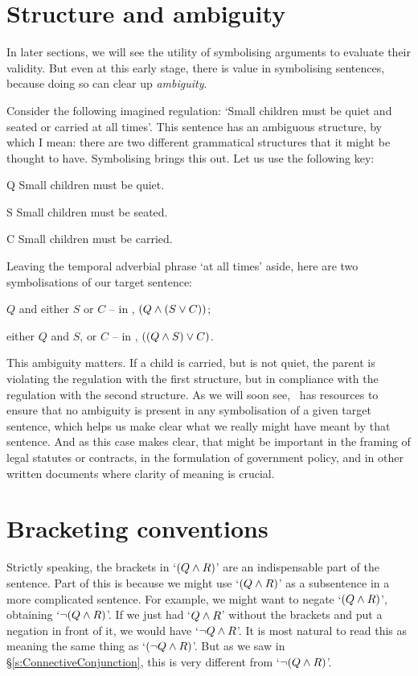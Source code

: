 \section{Structure and ambiguity}

In later sections, we will see the utility of symbolising arguments to evaluate their validity. But even at this early stage, there is value in symbolising sentences, because doing so can clear up \emph{ambiguity}.

Consider the following imagined regulation: `Small children must be quiet and seated or carried at all times'. This sentence has an ambiguous structure, by which I mean: there are two different grammatical structures that it might be thought to have. Symbolising brings this out. Let us use the following key:
\begin{ekey}
	\item[Q] Small children must be quiet.
	\item[S] Small children must be seated.
	\item[C] Small children must be carried.
\end{ekey}
Leaving the temporal adverbial phrase `at all times' aside, here are two symbolisations of our target sentence:\begin{earg}
	\item[] $Q$ \textsf{and} \textsf{either} $S$ \textsf{or} $C$ – in \TFL, $(Q \wedge (S \vee C))$;
	\item[] \textsf{either} $Q$ \textsf{and}  $S$, \textsf{or} $C$ – in \TFL, $((Q \wedge S) \vee C)$.
\end{earg}
This ambiguity matters. If a child is carried, but is not quiet, the parent is violating the regulation with the first structure, but in compliance with the regulation with the second structure. As we will soon see, \TFL\ has resources to ensure that no ambiguity is present in any symbolisation of a given target sentence, which helps us make clear what we really might have meant by that sentence. And as this case makes clear, that might be important in the framing of legal statutes or contracts, in the formulation of government policy, and in other written documents where clarity of meaning is crucial.

\section{Bracketing conventions}
\label{TFLconventions}
Strictly speaking, the brackets in `$(Q \wedge R)$' are an indispensable part of the sentence. Part of this is because we might use `$(Q \wedge R)$' as a subsentence in a more complicated sentence. For example, we might want to negate `$(Q \wedge R)$', obtaining `$\neg(Q \wedge R)$'. If we just had `$Q \wedge R$' without the brackets and put a negation in front of it, we would have `$\neg Q \wedge R$'. It is most natural to read this as meaning the same thing as `$(\neg Q \wedge R)$'. But as we saw in  §\ref{s:ConnectiveConjunction}, this is very different from `$\neg(Q\wedge R)$'.

